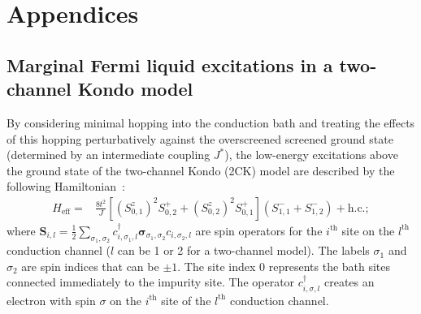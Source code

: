 \documentclass[reprint,hidelinks,onecolumn]{revtex4-2}
\begin{document}
\clearpage
\section*{Appendices}
\appendix
\subsection{Marginal Fermi liquid excitations in a two-channel Kondo model}\label{mflDerivation}
By considering minimal hopping into the conduction bath and treating the effects of this hopping perturbatively against the overscreened screened ground state (determined by an intermediate coupling \(J^*\)), the low-energy excitations above the ground state of the two-channel Kondo (2CK) model are described by the following Hamiltonian~\cite{Patra2023MCK}:
\begin{eqnarray}
	\label{nfl_terms}
	H_\mathrm{eff} =& \frac{8t^2}{{J}}\left[\left(S^z_{0,1}\right)^2 S^+_{0,2} + \left(S^z_{0,2}\right)^2 S^+_{0,1}\right] \left(S^-_{1,1} + S^-_{1,2}\right) + \mathrm{h.c.};
\end{eqnarray}
where \({\boldsymbol S}_{i,l} = \frac{1}{2}\sum_{\sigma_1,\sigma_2}c^\dagger_{i,\sigma_1,l}{\boldsymbol \sigma}_{\sigma_1,\sigma_2}c_{i,\sigma_2,l}\) are spin operators for the \(i^\text{th}\) site on the \(l^\text{th}\) conduction channel (\(l\) can be 1 or 2 for a two-channel model). The labels \(\sigma_1\) and \(\sigma_2\) are spin indices that can be \(\pm 1\). The site index \(0\) represents the bath sites connected immediately to the impurity site. The operator \(c^\dagger_{i,\sigma,l}\) creates an electron with spin \(\sigma\) on the \(i^\text{th}\) site of the \(l^\text{th}\) conduction channel.
\end{document}
